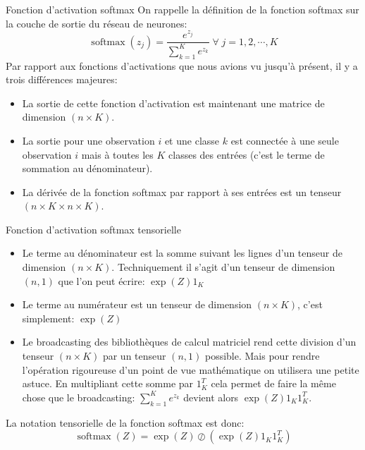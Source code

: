 \begin{frame}{Fonction d'activation softmax}
	On rappelle la définition de la fonction softmax sur la couche de sortie du réseau de neurones:
	\begin{equation*}
		\operatorname{softmax}(z_j) = \frac{e^{z_j}}{\sum_{k=1}^{K} e^{z_k}} \; \forall \; j = 1, 2, \cdots, K
	\end{equation*}
	\pause
	Par rapport aux fonctions d'activations que nous avions vu jusqu'à présent, il y a trois différences majeures:
	\begin{itemize}
		\item La sortie de cette fonction d'activation est maintenant une matrice de dimension $(n \times K)$.
		\item La sortie pour une observation $i$ et une classe $k$ est connectée à une seule observation $i$ mais à toutes les $K$ classes des entrées (c'est le terme de sommation au dénominateur).
		\item La dérivée de la fonction softmax par rapport à ses entrées est un tenseur $(n\times K \times n \times K)$.
	\end{itemize}
\end{frame}

\begin{frame}{Fonction d'activation softmax tensorielle}
	\begin{itemize}
		\item Le terme au dénominateur est la somme suivant les lignes d'un tenseur de dimension $(n \times K)$. Techniquement il s'agit d'un tenseur de dimension $(n, 1)$ que l'on peut écrire: $\exp{(Z)} 1_K$
		\pause
		\item Le terme au numérateur est un tenseur de dimension $(n \times K)$, c'est simplement: $\exp{(Z)}$
		\pause
		\item Le broadcasting des bibliothèques de calcul matriciel rend cette division d'un tenseur $(n \times K)$ par un tenseur $(n, 1)$ possible. Mais pour rendre l'opération rigoureuse d'un point de vue mathématique on utilisera une petite astuce. En multipliant cette somme par $1_K^T$ cela permet de faire la même chose que le broadcasting: $\sum_{k=1}^{K} e^{z_k}$ devient alors $\exp{(Z)} 1_K 1_K^T$.
	\end{itemize}
	La notation tensorielle de la fonction softmax est donc:
	\begin{equation*}
		\operatorname{softmax}(Z) = \exp{(Z)} \oslash \left(\exp{(Z)} 1_K 1_K^T\right)
	\end{equation*}
\end{frame}

